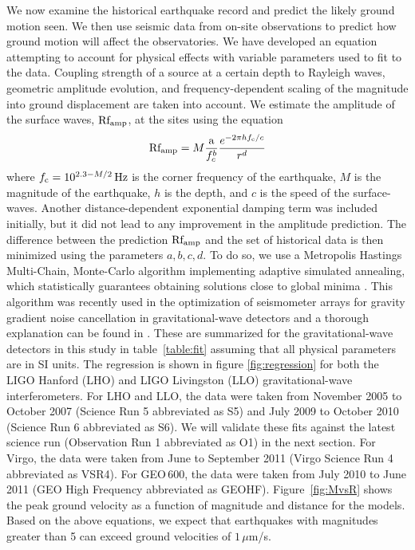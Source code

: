 \documentclass[twocolumn, prl, superscriptaddress]{revtex4}
\begin{document}
We now examine the historical earthquake record and predict the likely ground motion seen. We then use seismic data from on-site observations to predict how ground motion will affect the observatories. We have developed an equation attempting to account for physical effects with variable parameters used to fit to the data. Coupling strength of a source at a certain depth to Rayleigh waves, geometric amplitude evolution, and frequency-dependent scaling of the magnitude into ground displacement are taken into account. We estimate the amplitude of the surface waves, $\rm Rf_{amp}$, at the sites using the equation
\begin{equation}
{\rm Rf_{amp}} = M \frac{\rm a}{f_c^{b}} \frac{e^{-2 \pi h f_{\rm c}/c}}{r^{d}}
\label{eq:Rfamp} 
\end{equation}
where $f_{\rm c} = 10^{2.3-M/2}\,\rm Hz$ is the corner frequency of the earthquake,  $M$ is the magnitude of the earthquake, $h$ is the depth, and $c$ is the speed of the surface-waves. Another distance-dependent exponential damping term was included initially, but it did not lead to any improvement in the amplitude prediction. 
The difference between the prediction ${\rm Rf_{amp}}$ and the set of historical data is then minimized using the parameters $a,b,c,d$.
To do so, we use a Metropolis Hastings Multi-Chain, Monte-Carlo algorithm implementing adaptive simulated annealing, which statistically guarantees obtaining solutions close to global minima \cite{KiGe1983,In2000}. This algorithm was recently used in the optimization of seismometer arrays for gravity gradient noise cancellation in gravitational-wave detectors and a thorough explanation can be found in \cite{CoMu2016}. These are summarized for the gravitational-wave detectors in this study in table~\ref{table:fit} assuming that all physical parameters are in SI units. The regression is shown in figure \ref{fig:regression} for both the LIGO Hanford (LHO) and LIGO Livingston (LLO) gravitational-wave interferometers. For LHO and LLO, the data were taken from November 2005 to October 2007 (Science Run 5 abbreviated as S5) and July 2009 to October 2010 (Science Run 6 abbreviated as S6). We will validate these fits against the latest science run (Observation Run 1 abbreviated as O1)  in the next section. For Virgo, the data were taken from June to September 2011 (Virgo Science Run 4 abbreviated as VSR4). For GEO\,600, the data were taken from July 2010 to June 2011 (GEO High Frequency abbreviated as GEOHF). Figure~\ref{fig:MvsR} shows the peak ground velocity as a function of magnitude and distance for the models. Based on the above equations, we expect that earthquakes with magnitudes greater than 5 can exceed ground velocities of $1\,\mu$m/s.
\end{document}

